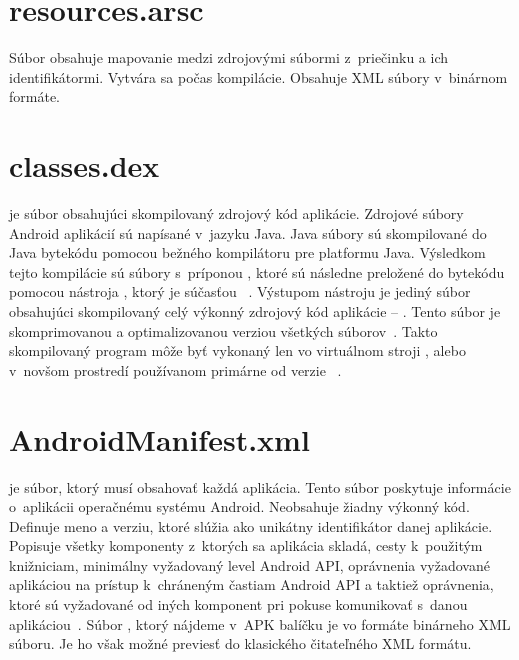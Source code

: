\section{resources.arsc}
\label{resources.arsc}
Súbor  obsahuje mapovanie medzi zdrojovými súbormi  z~priečinku  a ich identifikátormi.  Vytvára sa počas kompilácie. Obsahuje XML súbory v~binárnom formáte.

\section{classes.dex}
\label{classes.dex}
 je súbor obsahujúci skompilovaný zdrojový kód aplikácie.  Zdrojové súbory Android aplikácií sú napísané v~jazyku Java. Java súbory sú skompilované do Java bytekódu pomocou bežného kompilátoru pre platformu Java. Výsledkom tejto kompilácie sú súbory s~príponou , ktoré sú následne preložené do  bytekódu pomocou nástroja , ktorý je súčasťou ~\cite{Reddy2014}. Výstupom nástroju  je jediný súbor obsahujúci skompilovaný celý výkonný zdrojový kód aplikácie -- . Tento súbor je skomprimovanou a optimalizovanou verziou všetkých  súborov~\cite{Georgiev2014}. Takto skompilovaný program môže byť vykonaný len vo virtuálnom stroji , alebo v~novšom prostredí  používanom primárne od verzie ~\cite{dalvik}.

\section{AndroidManifest.xml} 
\label{AndroidManifest.xml}
 je súbor, ktorý musí obsahovať každá aplikácia. Tento súbor poskytuje informácie o~aplikácii operačnému systému Android. Neobsahuje žiadny výkonný kód. Definuje meno a verziu, ktoré slúžia ako unikátny identifikátor danej aplikácie. Popisuje všetky komponenty z~ktorých sa aplikácia skladá, cesty k~použitým knižniciam, minimálny vyžadovaný level Android API, oprávnenia vyžadované aplikáciou na prístup k~chráneným častiam Android API a taktiež oprávnenia, ktoré sú vyžadované od iných komponent pri pokuse komunikovať s~danou aplikáciou~\cite{appManifest}. Súbor , ktorý nájdeme v~APK balíčku je vo formáte binárneho XML súboru. Je ho však možné previesť do klasického čitateľného XML formátu.

